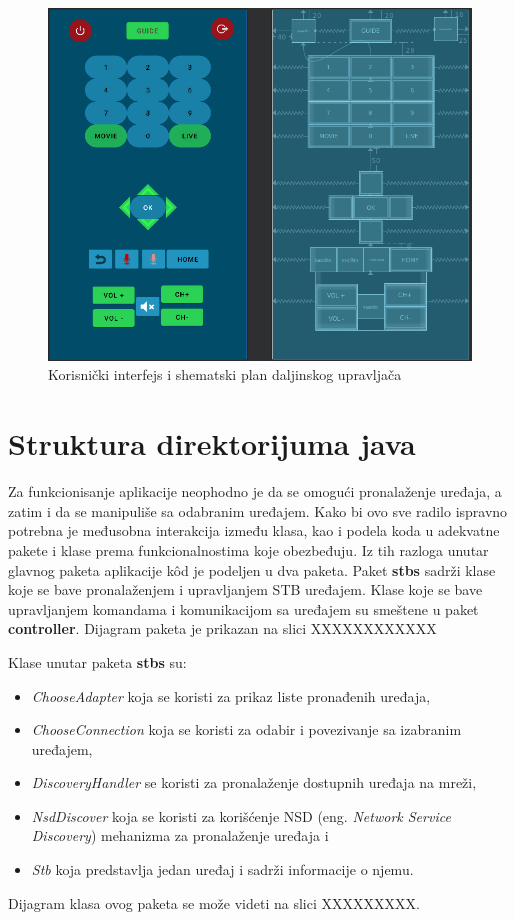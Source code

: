 \documentclass[implementacija.tex]{subfiles}
\begin{document}
\begin{figure}[!ht]
  \centering
  \includegraphics[width=\textwidth]{Implementacija/snimci_ekrana/remote_control_scene.png}
  \caption{Korisnički interfejs i shematski plan daljinskog upravljača}
  \label{fig:remoteScena}
\end{figure}


\section{Struktura direktorijuma java}
Za funkcionisanje aplikacije neophodno je da se omogući pronalaženje uređaja, a zatim i da se manipuliše sa odabranim uređajem. Kako bi ovo sve radilo ispravno potrebna je međusobna interakcija između klasa, kao i podela koda u adekvatne pakete i klase prema funkcionalnostima koje obezbeđuju. Iz tih razloga unutar glavnog paketa aplikacije k\^{o}d je podeljen u dva paketa. Paket \textbf{stbs} sadrži klase koje se bave pronalaženjem i upravljanjem STB uređajem. Klase koje se bave upravljanjem komandama i komunikacijom sa uređajem su smeštene u paket \textbf{controller}.  Dijagram paketa je prikazan na slici XXXXXXXXXXXX

Klase unutar paketa \textbf{stbs} su:
\begin{itemize}
\item \textit{ChooseAdapter} koja se koristi za prikaz liste pronađenih uređaja,
\item \textit{ChooseConnection} koja se koristi za odabir i povezivanje sa izabranim uređajem,
\item \textit{DiscoveryHandler} se koristi za pronalaženje dostupnih uređaja na mreži,
\item \textit{NsdDiscover} koja se koristi za korišćenje NSD (eng. \textit{Network Service Discovery}) mehanizma za pronalaženje uređaja i
\item \textit{Stb} koja predstavlja jedan uređaj i sadrži informacije o njemu.
\end{itemize}
Dijagram klasa ovog paketa se može videti na slici XXXXXXXXX.
\end{document}
